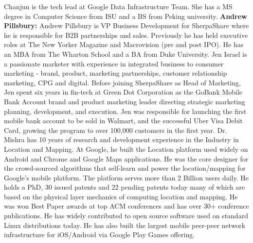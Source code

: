 \newline
{} Chanjun is the tech lead at Google Data Infrastructure Team. She has a MS degree in
Computer Science from ISU and a BS from Peking university. 
\newline
\newline
\noindent
{\bf Andrew Pillsbury:}
Andrew Pillsbury is VP Business Development for SherpaShare where he is responsible for B2B partnerships and sales. Previously he has held executive roles at The New Yorker Magazine and Macrovision (pre and post IPO). He has an MBA from The Wharton School and a BA from Duke University.
\newline
\newline
{}
Jen Israel is a passionate marketer with experience in integrated business to consumer marketing - brand, product,
marketing partnerships, customer relationship marketing, CPG and digital. Before joining SherpaShare as Head of
Marketing, Jen spent six years in fin-tech at Green Dot Corporation as the GoBank Mobile Bank Account brand and product
marketing leader directing strategic marketing planning, development, and execution.  Jen was responsible for launching
the first mobile bank account to be sold in Walmart, and the successful Uber Visa Debit Card, growing the program to
over 100,000 customers in the first year.
\newline
\newline
{} Dr. Mishra has 10 years of research and development experience in the Industry in
Location and Mapping. At Google, he built the Location platform used widely on Android and Chrome and Google Maps
applications. He was the core designer for the crowd-sourced algorithms that self-learn and power the location/mapping
for Google's mobile platform. The platform serves more than 2 Billion users daily. He holds a PhD, 30 issued patents and
22 pending patents today many of which are based on the physical layer mechanics of computing location and mapping. He
was won Best Paper awards at top ACM conferences and has over 30+ conference publications. He has widely contributed to
open source software used on standard Linux distributions today. He has also built the largest mobile peer-peer network
infrastructure for iOS/Android via Google Play Games offering.
